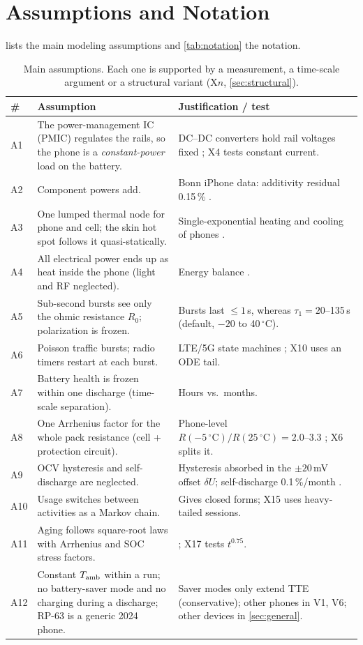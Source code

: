 \section{Assumptions and Notation}\label{sec:assumptions}
 lists the main modeling assumptions and \cref{tab:notation} the notation.

\begin{table}[h]
\centering\small
\caption{Main assumptions. Each one is supported by a measurement, a time-scale argument or a structural
variant (X$n$, \cref{sec:structural}).}
\label{tab:assumptions}
\begin{tabularx}{\textwidth}{@{}lXX@{}}
\toprule
\# & Assumption & Justification / test \\
\midrule
A1 & The power-management IC (PMIC) regulates the rails, so the phone is a \emph{constant-power} load on the battery. & DC--DC converters hold rail voltages fixed \cite{CH13}; X4 tests constant current. \\
A2 & Component powers add. & Bonn iPhone data: additivity residual 0.15\,\% \cite{BONN26}. \\
A3 & One lumped thermal node for phone and cell; the skin hot spot follows it quasi-statically. & Single-exponential heating and cooling of phones \cite{HE19}. \\
A4 & All electrical power ends up as heat inside the phone (light and RF neglected). & Energy balance \cite{BERN85}. \\
A5 & Sub-second bursts see only the ohmic resistance $R_0$; polarization is frozen. & Bursts last $\le 1$\,s, whereas $\tau_1=20$--135\,s (default, $-20$ to 40\,$^\circ$C). \\
A6 & Poisson traffic bursts; radio timers restart at each burst. & LTE/5G state machines \cite{HU12,NA21}; X10 uses an ODE tail. \\
A7 & Battery health is frozen within one discharge (time-scale separation). & Hours vs.\ months. \\
A8 & One Arrhenius factor for the whole pack resistance (cell + protection circuit). & Phone-level $R(-5\,^\circ\mathrm C)/R(25\,^\circ\mathrm C)=2.0$--$3.3$ \cite{LEE20}; X6 splits it. \\
A9 & OCV hysteresis and self-discharge are neglected. & Hysteresis absorbed in the $\pm20$\,mV offset $\delta U$; self-discharge 0.1\,\%/month \cite{ZIL19}. \\
A10 & Usage switches between activities as a Markov chain. & Gives closed forms; X15 uses heavy-tailed sessions. \\
A11 & Aging follows square-root laws with Arrhenius and SOC stress factors. & \cite{SCM18,SCH14,KEIL16}; X17 tests $t^{0.75}$. \\
A12 & Constant $T_{\mathrm{amb}}$ within a run; no battery-saver mode and no charging during a discharge; RP-63 is a generic 2024 phone. & Saver modes only extend TTE (conservative); other phones in V1, V6; other devices in \cref{sec:general}. \\
\bottomrule
\end{tabularx}
\end{table}

